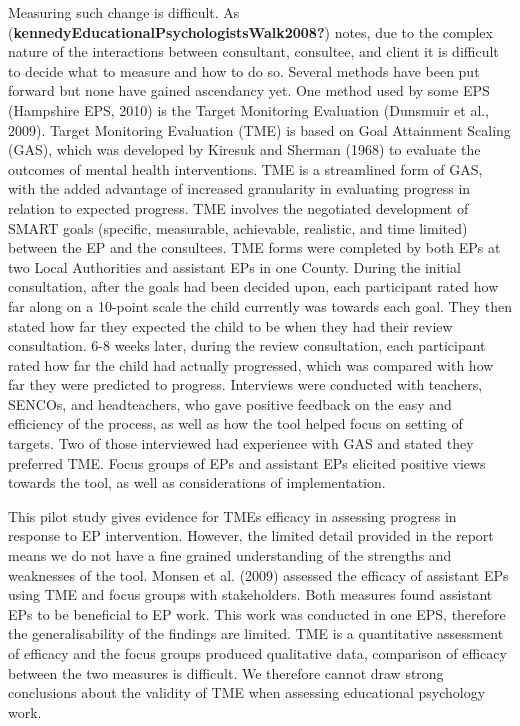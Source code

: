 \documentclass[
  english,
  man]{apa7}
\begin{document}
Measuring such change is difficult. As (\textbf{kennedyEducationalPsychologistsWalk2008?}) notes, due to the complex nature of the interactions between consultant, consultee, and client it is difficult to decide what to measure and how to do so. Several methods have been put forward but none have gained ascendancy yet. One method used by some EPS (Hampshire EPS, 2010) is the Target Monitoring Evaluation (Dunsmuir et al., 2009). Target Monitoring Evaluation (TME) is based on Goal Attainment Scaling (GAS), which was developed by Kiresuk and Sherman (1968) to evaluate the outcomes of mental health interventions. TME is a streamlined form of GAS, with the added advantage of increased granularity in evaluating progress in relation to expected progress. TME involves the negotiated development of SMART goals (specific, measurable, achievable, realistic, and time limited) between the EP and the consultees. TME forms were completed by both EPs at two Local Authorities and assistant EPs in one County. During the initial consultation, after the goals had been decided upon, each participant rated how far along on a 10-point scale the child currently was towards each goal. They then stated how far they expected the child to be when they had their review consultation. 6-8 weeks later, during the review consultation, each participant rated how far the child had actually progressed, which was compared with how far they were predicted to progress. Interviews were conducted with teachers, SENCOs, and headteachers, who gave positive feedback on the easy and efficiency of the process, as well as how the tool helped focus on setting of targets. Two of those interviewed had experience with GAS and stated they preferred TME. Focus groups of EPs and assistant EPs elicited positive views towards the tool, as well as considerations of implementation.

This pilot study gives evidence for TMEs efficacy in assessing progress in response to EP intervention. However, the limited detail provided in the report means we do not have a fine grained understanding of the strengths and weaknesses of the tool. Monsen et al. (2009) assessed the efficacy of assistant EPs using TME and focus groups with stakeholders. Both measures found assistant EPs to be beneficial to EP work. This work was conducted in one EPS, therefore the generalisability of the findings are limited. TME is a quantitative assessment of efficacy and the focus groups produced qualitative data, comparison of efficacy between the two measures is difficult. We therefore cannot draw strong conclusions about the validity of TME when assessing educational psychology work.
\end{document}
